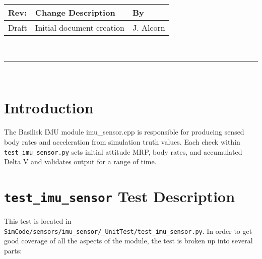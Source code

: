 \documentclass[]{BasiliskReportMemo}
\begin{document}
\makeCover


%
%
\pagestyle{empty}
{\renewcommand{\arraystretch}{1.1}
\noindent
\begin{longtable}{|p{0.5in}|p{4.5in}|p{1.14in}|}
\hline
{\bfseries Rev}: & {\bfseries Change Description} & {\bfseries By} \\
\hline
Draft & Initial document creation & J. Alcorn \\
\hline

\end{longtable}
}

\newpage
\setcounter{page}{1}
\pagestyle{fancy}

\tableofcontents
~\\ \hrule ~\\


\section{Introduction}
The Basilisk IMU module imu\_sensor.cpp is responsible for producing sensed body rates and acceleration from simulation truth values. Each check within {\tt test\_imu\_sensor.py} sets initial attitude MRP, body rates, and accumulated Delta V and validates output for a range of time.

\section{{\tt test\_imu\_sensor} Test Description}

This test is located in {\tt SimCode/sensors/imu\_sensor/\_UnitTest/test\_imu\_sensor.py}. In order to get good coverage of all the aspects of the module, the test is broken up into several parts: \par
\end{document}
